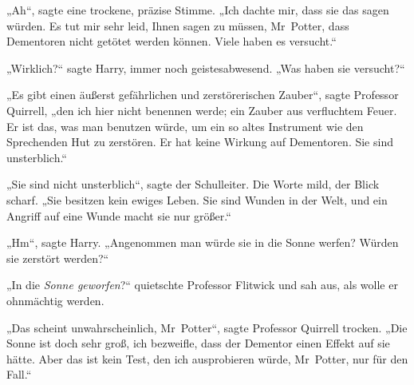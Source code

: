 „Ah“, sagte eine trockene, präzise Stimme.
„Ich dachte mir, dass sie das sagen würden. Es tut mir sehr leid, Ihnen sagen zu müssen, Mr~Potter, dass Dementoren nicht getötet werden können. Viele haben es versucht.“

„Wirklich?“ sagte Harry, immer noch geistesabwesend.
„Was haben sie versucht?“

„Es gibt einen äußerst gefährlichen und zerstörerischen Zauber“, sagte Professor Quirrell, „den ich hier nicht benennen werde; ein Zauber aus verfluchtem Feuer. Er ist das, was man benutzen würde, um ein so altes Instrument wie den Sprechenden Hut zu zerstören. Er hat keine Wirkung auf Dementoren. Sie sind unsterblich.“

„Sie sind nicht unsterblich“, sagte der Schulleiter. Die Worte mild, der Blick scharf.
„Sie besitzen kein ewiges Leben. Sie sind Wunden in der Welt, und ein Angriff auf eine Wunde macht sie nur größer.“

„Hm“, sagte Harry.
„Angenommen man würde sie in die Sonne werfen? Würden sie zerstört werden?“

„In die \emph{Sonne geworfen}?“ quietschte Professor Flitwick und sah aus, als wolle er ohnmächtig werden.

„Das scheint unwahrscheinlich, Mr~Potter“, sagte Professor Quirrell trocken.
„Die Sonne ist doch sehr groß, ich bezweifle, dass der Dementor einen Effekt auf sie hätte. Aber das ist kein Test, den ich ausprobieren würde, Mr~Potter, nur für den Fall.“

